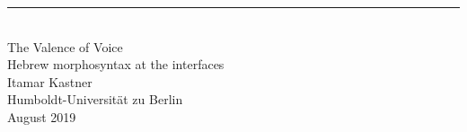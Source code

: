 \singlespacing
\begin{center}
\rule{165pt}{0pt} \\
\vspace{1cm}
\LARGE{The Valence of Voice}\\
\vspace{1cm}
\Large{Hebrew morphosyntax at the interfaces}\\
\vspace{2cm}
\large{Itamar Kastner} \\
\vspace{0.4cm}
\normalsize{Humboldt-Universit\"at zu Berlin} \\
\vspace{1cm}
\normalsize{August 2019} %

\end{center}
